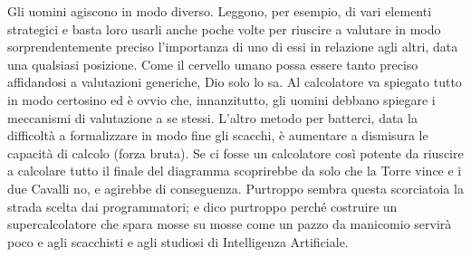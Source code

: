 Gli uomini agiscono in modo diverso. Leggono, per esempio, di vari
elementi strategici e basta loro usarli anche poche volte per riuscire a
valutare in modo sorprendentemente preciso l'importanza di uno di essi
in relazione agli altri, data una qualsiasi posizione. Come il cervello
umano possa essere tanto preciso affidandosi a valutazioni generiche,
Dio solo lo sa. Al calcolatore va spiegato tutto in modo certosino ed è
ovvio che, innanzitutto, gli uomini debbano spiegare i meccanismi di
valutazione a se stessi. L'altro metodo per batterci, data la difficoltà
a formalizzare in modo fine gli scacchi, è aumentare a dismisura le
capacità di calcolo (forza bruta). Se ci fosse un calcolatore così
potente da riuscire a calcolare tutto il finale del diagramma
scoprirebbe da solo che la Torre vince e i due Cavalli no, e agirebbe di
conseguenza. Purtroppo sembra questa scorciatoia la strada scelta dai
programmatori; e dico purtroppo perché costruire un supercalcolatore che
spara mosse su mosse come un pazzo da manicomio servirà poco e agli
scacchisti e agli studiosi di Intelligenza Artificiale.
